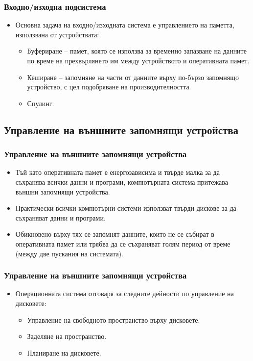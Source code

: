 \documentclass[ignorenonframetext, hyperref=unicode]{beamer}
\begin{document}
\begin{frame}
\frametitle{Входно/изходна подсистема}
\begin{itemize}
\item Основна задача на входно/изходната система е управлението на паметта,
използвана от устройствата:
  \begin{itemize}
    \item Буфериране -- памет, която се използва за временно запазване на
    данните по време на прехвърлянето им между устройството и оперативната
    памет.
    \item Кеширане -- запомняне на части от данните върху по-бързо запомнящо
    устройство, с цел подобряване на производителността.
    \item Спулинг. 
  \end{itemize}
\end{itemize}
\end{frame}

\subsection{Управление на външните запомнящи устройства}

\begin{frame}
\frametitle{Управление на външните запомнящи устройства}
\begin{itemize}
\item Тъй като оперативната памет е енергозависима и твърде малка за да
съхранява всички данни и програми, компютърната система притежава външни
запомнящи устройства.
\item Практически всички компютърни системи използват твърди дискове за да
съхраняват данни и програми.
\item Обикновено върху тях се запомнят данните, които не се събират в
оперативната памет или трябва да се съхраняват голям период от време (между две
пускания на системата).
\end{itemize}
\end{frame}

\begin{frame}
\frametitle{Управление на външните запомнящи устройства}
\begin{itemize}
\item Операционната система отговаря за следните дейности по управление на
дисковете:
\begin{itemize}
  \item Управление на свободното пространство върху дисковете.
  \item Заделяне на пространство.
  \item Планиране на дисковете.
\end{itemize}
\end{itemize}
\end{frame}
         
\end{document}
